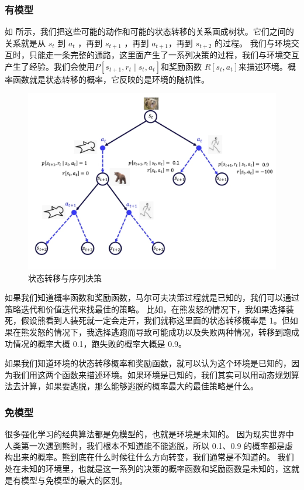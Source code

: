 \subsubsection{有模型} 

如 所示，我们把这些可能的动作和可能的状态转移的关系画成树状。它们之间的关系就是从 $s_t$ 到 $a_t$ ，再到 $s_{t+1}$ ，再到 $a_{t+1}$，再到 $s_{t+2}$ 的过程。
我们与环境交互时，只能走一条完整的通路，这里面产生了一系列决策的过程，我们与环境交互产生了经验。我们会使用$P\left[s_{t+1}, r_{t} \mid s_{t}, a_{t}\right]$和奖励函数 $R\left[s_{t}, a_{t}\right]$来描述环境。概率函数就是状态转移的概率，它反映的是环境的随机性。
\begin{figure}[htb]
	\centering
	\includegraphics[width=0.5\linewidth]{res/ch3/3.2}
	\caption{状态转移与序列决策}
	\label{fig:fig3.2}
\end{figure}

如果我们知道概率函数和奖励函数，马尔可夫决策过程就是已知的，我们可以通过策略迭代和价值迭代来找最佳的策略。
比如，在熊发怒的情况下，我如果选择装死，假设熊看到人装死就一定会走开，我们就称这里面的状态转移概率是 1。但如果在熊发怒的情况下，我选择逃跑而导致可能成功以及失败两种情况，转移到跑成功情况的概率大概 0.1，跑失败的概率大概是 0.9。

如果我们知道环境的状态转移概率和奖励函数，就可以认为这个环境是已知的，因为我们用这两个函数来描述环境。如果环境是已知的，我们其实可以用动态规划算法去计算，如果要逃脱，那么能够逃脱的概率最大的最佳策略是什么。

\subsubsection{免模型} 
很多强化学习的经典算法都是免模型的，也就是环境是未知的。
因为现实世界中人类第一次遇到熊时，我们根本不知道能不能逃脱，所以 0.1、0.9 的概率都是虚构出来的概率。熊到底在什么时候往什么方向转变，我们通常是不知道的。
我们处在未知的环境里，也就是这一系列的决策的概率函数和奖励函数是未知的，这就是有模型与免模型的最大的区别。

